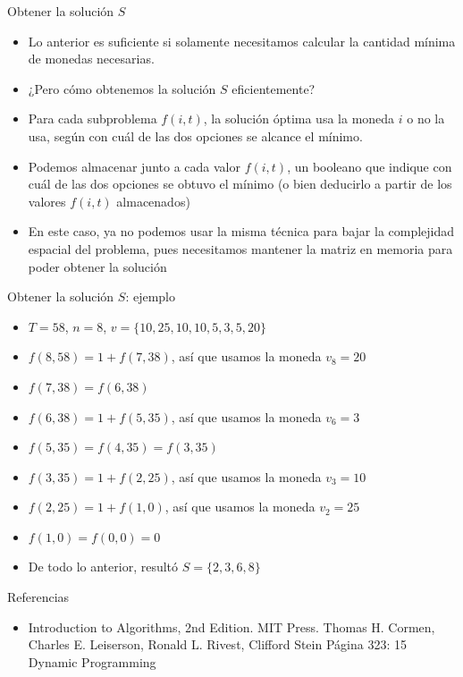 \documentclass{beamer}
\begin{document}
\begin{frame}{Obtener la solución $S$}

\begin{itemize}
    \item Lo anterior es suficiente si solamente necesitamos calcular la cantidad mínima de monedas necesarias.
    \item ¿Pero cómo obtenemos la solución $S$ eficientemente?
    \item Para cada subproblema $f(i, t)$, la solución óptima usa la moneda $i$ o no la usa, según con cuál de las dos opciones se alcance el mínimo.
    \item Podemos almacenar junto a cada valor $f(i, t)$, un booleano que indique con cuál de las dos opciones se obtuvo el mínimo (o bien deducirlo a partir de los valores $f(i,t)$ almacenados)
    \item En este caso, ya no podemos usar la misma técnica para bajar la complejidad espacial del problema, pues necesitamos mantener la matriz en memoria para poder obtener la solución
\end{itemize}

\end{frame}

\begin{frame}{Obtener la solución $S$: ejemplo}

\begin{itemize}
    \item $T= 58$, $n=8$, $v = \{10, 25, 10, 10, 5, 3, 5, 20 \}$
    \item $f(8, 58) = 1 + f(7,38)$, así que usamos la moneda $v_8 = 20$
    \item $f(7, 38) = f(6,38)$
    \item $f(6, 38) = 1 + f(5,35)$, así que usamos la moneda $v_6 = 3$
    \item $f(5, 35) = f(4,35) = f(3, 35)$
    \item $f(3, 35) = 1 + f(2, 25)$, así que usamos la moneda $v_3 = 10$
    \item $f(2, 25) = 1 + f(1, 0)$, así que usamos la moneda $v_2 = 25$
    \item $f(1, 0) = f(0, 0) = 0$
    \item De todo lo anterior, resultó $S=\{2, 3, 6, 8 \}$
    
\end{itemize}

\end{frame}


\begin{frame}{Referencias}
   \begin{itemize}
   \item Introduction to Algorithms, 2nd Edition. MIT Press. Thomas H. Cormen, Charles E. Leiserson, Ronald L. Rivest, Clifford Stein
   Página 323: 15 Dynamic Programming
  \end{itemize}
\end{frame}
\end{document}
